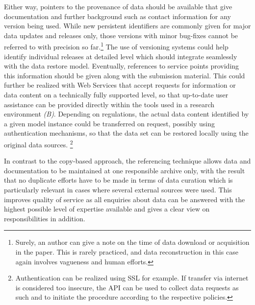 \documentclass{acm_proc_article-sp}
\begin{document}
Either way, pointers to the provenance of data should be available that give documentation and further background such as contact information for any version being used.
While new persistent identifiers are commonly given for major data updates and releases only, those versions with minor bug-fixes cannot be referred to with precision so far.\footnote{Surely, an author can give a note on the time of data download or acquisition in the paper. This is rarely practiced, and data reconstruction in this case again involves vagueness and human efforts.}
The use of versioning systems could help identify individual releases at detailed level \cite{KoenkerZeileis2009} which should integrate seamlessly with the data restore model.
Eventually, references to service points providing this information should be given along with the submission material.
This could further be realized with Web Services that accept requests for information or data content on a technically fully supported level, so that up-to-date user assistance can be provided directly within the tools used in a research environment \textit{(B)}.
Depending on regulations, the actual data content identified by a given model instance could be transferred on request, possibly using authentication mechanisms, so that the data set can be restored locally using the original data sources.
\footnote{Authentication can be realized using SSL for example. If transfer via internet is considered too insecure, the API can be used to collect data requests as such and to initiate the procedure according to the respective policies.}


In contrast to the copy-based approach, the referencing technique allows data and documentation to be maintained at one responsible archive only, with the result that no duplicate efforts have to be made in terms of data curation which is particularly relevant in cases where several external sources were used.
This improves quality of service as all enquiries about data can be answered with the highest possible level of expertise available and gives a clear view on responsibilities in addition.
\end{document}
